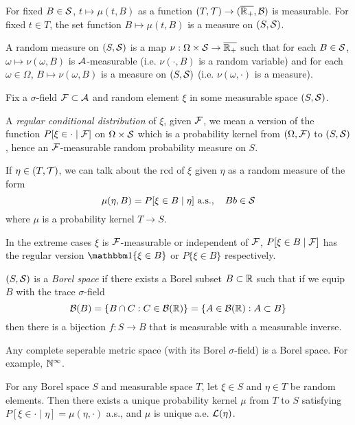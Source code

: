 For fixed $B \in \mathcal{S}$, $t \mapsto \mu(t, B)$ as a function
$(T, \mathcal{T}) \to (\overline{\mathbb{R}_+}, \mathcal{B})$ is measurable.
For fixed $t \in T$, the set function $B \mapsto \mu(t, B)$
is a measure on $(S, \mathcal{S})$.

A random measure on $(S, \mathcal{S})$ is a map $\nu : \Omega \times \mathcal{S} \to \overline{\mathbb{R}_+}$
such that for each $B \in \mathcal{S}$, $\omega \mapsto \nu(\omega, B)$ is $\mathcal{A}$-measurable
(i.e. $\nu(\cdot, B)$ is a random variable) and for each $\omega \in \Omega$,
$B \mapsto \nu(\omega, B)$ is a measure on $(S, \mathcal{S})$ (i.e. $\nu(\omega, \cdot)$
is a measure).

Fix a $\sigma$-field $\mathcal{F} \subset \mathcal{A}$ and random element $\xi$ in some measurable
space $(S, \mathcal{S})$.
\begin{definition}
  A \emph{regular conditional distribution} of $\xi$, given $\mathcal{F}$,
  we mean a version of the function $P[\xi \in \cdot \mid \mathcal{F}]$ on
  $\Omega \times \mathcal{S}$ which is a probability kernel from $(\Omega, \mathcal{F})$
  to $(S, \mathcal{S})$, hence an $\mathcal{F}$-measurable random probability measure
  on $S$.
\end{definition}

If $\eta \in (T, \mathcal{T})$, we can talk about the rcd of $\xi$ given $\eta$
as a random measure of the form
\[
  \mu(\eta, B) = P[\xi \in B \mid \eta]~\text{a.s.},\quad Bb \in \mathcal{S}
\]
where $\mu$ is a probability kernel $T \to S$.

In the extreme cases $\xi$ is $\mathcal{F}$-measurable or independent of $\mathcal{F}$,
$P[\xi \in B \mid \mathcal{F}]$ has the regular version $\ind\{\xi \in B\}$
or $P\{\xi \in B\}$ respectively.

\begin{definition}
  $(S, \mathcal{S})$ is a \emph{Borel space} if there exists
  a Borel subset $B \subset \mathbb{R}$ such that if we equip $B$ with the trace
  $\sigma$-field
  \[
    \mathcal{B}(B) = \{ B \cap C : C \in \mathcal{B}(\mathbb{R})\} = \{ A \in \mathcal{B}(\mathbb{R}) : A \subset B \}
  \]
  then there is a bijection $f : S \to B$ that is measurable with a measurable
  inverse.
\end{definition}

\begin{example}
  Any complete seperable metric space (with its Borel $\sigma$-field)
  is a Borel space. For example, $\mathbb{N}^\infty$.
\end{example}

\begin{theorem}
  For any Borel space $S$ and measurable space $T$, let $\xi \in S$
  and $\eta \in T$ be random elements. Then there exists a unique
  probability kernel $\mu$ from $T$ to $S$ satisfying
  $P[\xi \in \cdot \mid \eta] = \mu(\eta, \cdot)$ a.s.,
  and $\mu$ is unique a.e. $\mathcal{L}(\eta)$.
\end{theorem}


